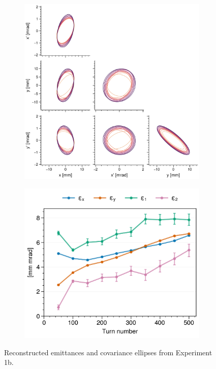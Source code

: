 \begin{figure}[!p]
    \centering
    \begin{subfigure}{0.6\textwidth}
        \includegraphics[width=\textwidth]{Images/chapter5/exp1b/corner.png}
    \end{subfigure}
    \hfill
    \begin{subfigure}[t]{0.39\textwidth}
        \includegraphics[width=\textwidth]{Images/chapter5/exp1b/emittances.png}
    \end{subfigure}
    \caption{Reconstructed emittances and covariance ellipses from Experiment 1b.}
    \label{fig:exp1b_emittances}
\end{figure}
